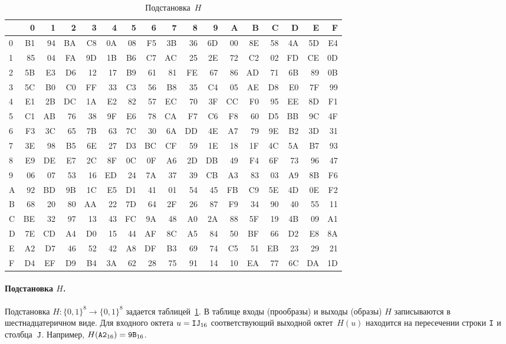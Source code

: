 \begin{table}[bht]
\caption{Подстановка~$H$}\label{Table.SBOX}
{\small\tt
{\tabcolsep=8.5pt
\begin{tabular}{|l|rrrrrrrrrrrrrrrr|}
\hline
 &  0&  1&  2&  3&  4&  5&  6&  7&  8&  9&  A&  B&  C&  D&  E&  F\\
\hline
0& B1& 94& BA& C8& 0A& 08& F5& 3B& 36& 6D& 00& 8E& 58& 4A& 5D& E4\\
1& 85& 04& FA& 9D& 1B& B6& C7& AC& 25& 2E& 72& C2& 02& FD& CE& 0D\\
2& 5B& E3& D6& 12& 17& B9& 61& 81& FE& 67& 86& AD& 71& 6B& 89& 0B\\
3& 5C& B0& C0& FF& 33& C3& 56& B8& 35& C4& 05& AE& D8& E0& 7F& 99\\
4& E1& 2B& DC& 1A& E2& 82& 57& EC& 70& 3F& CC& F0& 95& EE& 8D& F1\\
5& C1& AB& 76& 38& 9F& E6& 78& CA& F7& C6& F8& 60& D5& BB& 9C& 4F\\
6& F3& 3C& 65& 7B& 63& 7C& 30& 6A& DD& 4E& A7& 79& 9E& B2& 3D& 31\\
7& 3E& 98& B5& 6E& 27& D3& BC& CF& 59& 1E& 18& 1F& 4C& 5A& B7& 93\\
8& E9& DE& E7& 2C& 8F& 0C& 0F& A6& 2D& DB& 49& F4& 6F& 73& 96& 47\\
9& 06& 07& 53& 16& ED& 24& 7A& 37& 39& CB& A3& 83& 03& A9& 8B& F6\\
A& 92& BD& 9B& 1C& E5& D1& 41& 01& 54& 45& FB& C9& 5E& 4D& 0E& F2\\
B& 68& 20& 80& AA& 22& 7D& 64& 2F& 26& 87& F9& 34& 90& 40& 55& 11\\
C& BE& 32& 97& 13& 43& FC& 9A& 48& A0& 2A& 88& 5F& 19& 4B& 09& A1\\
D& 7E& CD& A4& D0& 15& 44& AF& 8C& A5& 84& 50& BF& 66& D2& E8& 8A\\
E& A2& D7& 46& 52& 42& A8& DF& B3& 69& 74& C5& 51& EB& 23& 29& 21\\
F& D4& EF& D9& B4& 3A& 62& 28& 75& 91& 14& 10& EA& 77& 6C& DA& 1D\\
\hline
\end{tabular}
} %
} %
\end{table}

\paragraph{Подстановка $H$.}
Подстановка $H\colon\{0,1\}^8\to\{0,1\}^8$ задается
таблицей~\ref{Table.SBOX}.
%
В таблице входы (прообразы) и выходы (образы) $H$ записываются в 
шестнадцатеричном виде.
%
Для входного октета $u=\texttt{IJ}_{16}$ соответствующий выходной октет~$H(u)$ 
находится на пересечении строки $\texttt{I}$ и столбца~$\texttt{J}$. 
Например, $H(\texttt{A2}_{16})=\texttt{9B}_{16}$.

